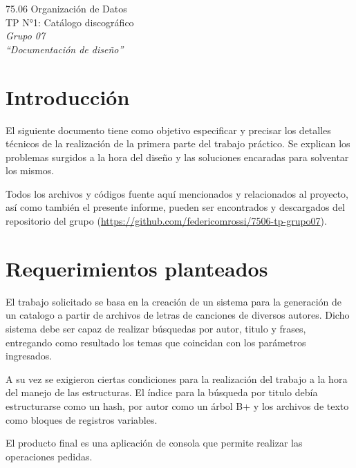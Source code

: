 \documentclass{article}
\begin{document}
\setcounter{page}{5}

\begin{titlepage}
	\vspace*{\fill}
	\begin{center}
		\Large 75.06 Organización de Datos \\
		\Huge TP N°1: Catálogo discográfico \\
		\bigskip\huge\textit{Grupo 07} \\
		\bigskip\bigskip\bigskip\bigskip\bigskip\bigskip
		\bigskip\bigskip\bigskip\bigskip\bigskip\bigskip\bigskip
		\medskip\huge\textit{``Documentación de diseño''} \\
		\date{}
	\end{center}
	\vspace*{\fill}
\end{titlepage}
\newpage



\tableofcontents
\newpage
{}


\section{Introducción}
	
	El siguiente documento tiene como objetivo especificar y precisar los detalles técnicos de la realización de la primera parte del trabajo práctico. Se explican los problemas surgidos a la hora del diseño y las soluciones encaradas para solventar los mismos.
	\par
	Todos los archivos y códigos fuente aquí mencionados y relacionados al proyecto, así como también el presente informe, pueden ser encontrados y descargados del repositorio del grupo (\url{https://github.com/federicomrossi/7506-tp-grupo07}).
\bigskip




\section{Requerimientos planteados}

	El trabajo solicitado se basa en la creación de un sistema para la generación de un catalogo a partir de archivos de letras de canciones de diversos autores. Dicho sistema debe ser capaz de realizar búsquedas por autor, titulo y frases, entregando como resultado los temas que coincidan con los parámetros ingresados.
	\par
	A su vez se exigieron ciertas condiciones para la realización del trabajo a la hora del manejo de las estructuras. El índice para la búsqueda por titulo debía estructurarse como un hash, por autor como un árbol B+ y los archivos de texto como bloques de registros variables.
	\par
	El producto final es una aplicación de consola que permite realizar las operaciones pedidas.
	\bigskip
\end{document}
